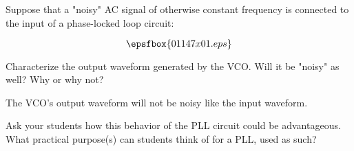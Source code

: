 

Suppose that a "noisy" AC signal of otherwise constant frequency is connected to the input of a phase-locked loop circuit:

$$\epsfbox{01147x01.eps}$$

Characterize the output waveform generated by the VCO.  Will it be "noisy" as well?  Why or why not?







The VCO's output waveform will not be noisy like the input waveform.







Ask your students how this behavior of the PLL circuit could be advantageous.  What practical purpose(s) can students think of for a PLL, used as such?



